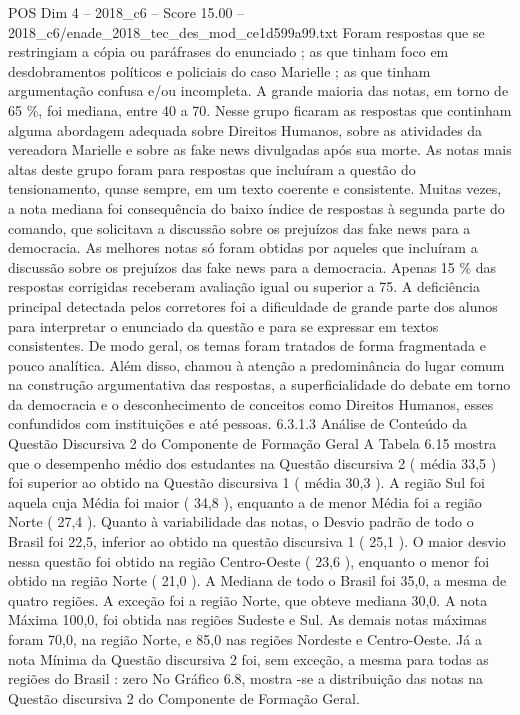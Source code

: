 \begin{textsample}{POS Dim 4 – 2018\_c6 – Score 15.00 – 2018\_c6/enade\_2018\_tec\_des\_mod\_ce1d599a99.txt}
Foram respostas que se restringiam a cópia ou paráfrases do enunciado ; as que tinham foco em desdobramentos políticos e policiais do caso Marielle ; as que tinham argumentação confusa e/ou incompleta.
A grande maioria das notas, em torno de 65 \%, foi mediana, entre 40 a 70.
Nesse grupo ficaram as respostas que continham alguma abordagem adequada sobre Direitos Humanos, sobre as atividades da vereadora Marielle e sobre as fake news divulgadas após sua morte.
As notas mais altas deste grupo foram para respostas que incluíram a questão do tensionamento, quase sempre, em um texto coerente e consistente.
Muitas vezes, a nota mediana foi consequência do baixo índice de respostas à segunda parte do comando, que solicitava a discussão sobre os prejuízos das fake news para a democracia.
As melhores notas só foram obtidas por aqueles que incluíram a discussão sobre os prejuízos das fake news para a democracia.
Apenas 15 \% das respostas corrigidas receberam avaliação igual ou superior a 75.
A deficiência principal detectada pelos corretores foi a dificuldade de grande parte dos alunos para interpretar o enunciado da questão e para se expressar em textos consistentes.
De modo geral, os temas foram tratados de forma fragmentada e pouco analítica.
Além disso, chamou à atenção a predominância do lugar comum na construção argumentativa das respostas, a superficialidade do debate em torno da democracia e o desconhecimento de conceitos como Direitos Humanos, esses confundidos com instituições e até pessoas. 6.3.1.3 Análise de Conteúdo da Questão Discursiva 2 do Componente de Formação Geral A Tabela 6.15 mostra que o desempenho médio dos estudantes na Questão discursiva 2 ( média 33,5 ) foi superior ao obtido na Questão discursiva 1 ( média 30,3 ).
A região Sul foi aquela cuja Média foi maior ( 34,8 ), enquanto a de menor Média foi a região Norte ( 27,4 ).
Quanto à variabilidade das notas, o Desvio padrão de todo o Brasil foi 22,5, inferior ao obtido na questão discursiva 1 ( 25,1 ).
O maior desvio nessa questão foi obtido na região Centro-Oeste ( 23,6 ), enquanto o menor foi obtido na região Norte ( 21,0 ).
A Mediana de todo o Brasil foi 35,0, a mesma de quatro regiões.
A exceção foi a região Norte, que obteve mediana 30,0.
A nota Máxima 100,0, foi obtida nas regiões Sudeste e Sul.
As demais notas máximas foram 70,0, na região Norte, e 85,0 nas regiões Nordeste e Centro-Oeste.
Já a nota Mínima da Questão discursiva 2 foi, sem exceção, a mesma para todas as regiões do Brasil : zero No Gráfico 6.8, mostra -se a distribuição das notas na Questão discursiva 2 do Componente de Formação Geral.

\end{textsample}
